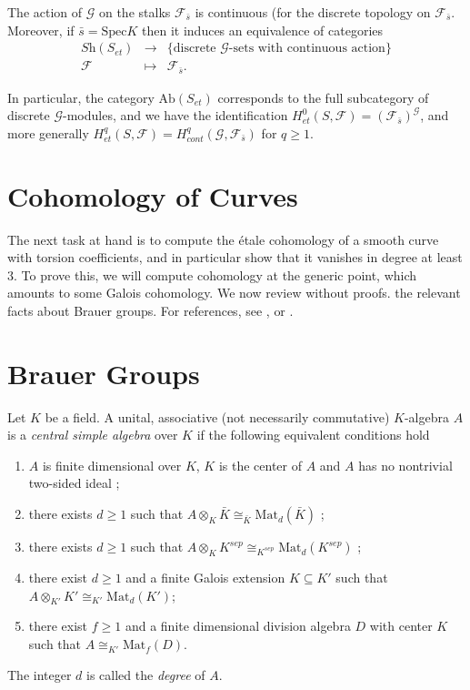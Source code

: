 \begin{theorem}
The action of $\mathcal{G}$ on the stalks $\mathcal{F}_{\bar s}$ is continuous 
(for the discrete topology on $\mathcal{F}_{\bar s}$. Moreover, if $\bar s= 
\text{Spec} K$ then it induces an equivalence of categories
$$
\begin{matrix}
\textit{Sh}(S_{et}) & \longrightarrow & \{ \text{discrete $\mathcal{G}$-sets 
with continuous action} \} \\
\mathcal{F} & \longmapsto & \mathcal{F}_{\bar s}.
\end{matrix}
$$
\end{theorem}

\noindent
In particular, the category $\text{Ab}(S_{et})$ corresponds to the full 
subcategory of discrete $\mathcal{G}$-modules, and we have the identification 
$H_{et}^0(S,\mathcal{F}) = (\mathcal{F}_{\bar s})^\mathcal{G}$, and more 
generally $H_{et}^q(S,\mathcal{F}) = H_{cont}^q (\mathcal{G}, \mathcal{F}_{\bar 
s})$ for $q \geq 1$.


\section{Cohomology of Curves}
\label{section-cohomology-curves}

\noindent
The next task at hand is to compute the \'etale cohomology of a smooth curve 
with torsion coefficients, and in particular show that it vanishes in degree at 
least 3. To prove this, we will compute cohomology at the generic point, which 
amounts to some Galois cohomology. We now review without proofs. the relevant 
facts about Brauer groups. For references, see \cite{SerreCorpsLocaux}, 
\cite{SerreGaloisCohomology} or \cite{Weil}.

\section{Brauer Groups}

\begin{theorem} \label{defthm:CSA}
Let $K$ be a field. A unital, associative (not necessarily commutative) 
$K$-algebra $A$ is a {\it central simple algebra} over $K$ if the following 
equivalent conditions hold
\begin{enumerate}
\item
$A$ is finite dimensional over $K$, $K$ is the center of $A$ and $A$ has no 
nontrivial two-sided ideal ;
\item
there exists $d \geq 1$ such that $A \otimes_K \bar K \cong_{\bar K} 
\text{Mat}_d(\bar K)$ ;
\item
there exists $d \geq 1$ such that $A \otimes_K K^{sep} \cong_{K^{sep}} 
\text{Mat}_d(K^{sep})$ ;
\item
there exist $d \geq 1$ and a finite Galois extension $K \subseteq K'$ such that 
$A \otimes_{K'} K' \cong_{K'} \text{Mat}_d(K')$; 
\item
there exist $f \geq 1$ and a finite dimensional division algebra $D$ with 
center $K$ such that $A \cong_{K'} \text{Mat}_f(D)$.
\end{enumerate}
The integer $d$ is called the {\it degree} of $A$. 
\end{theorem}

